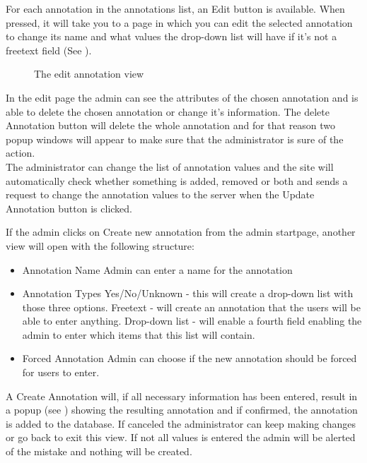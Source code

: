 For each annotation in the annotations list, an Edit button is available. 
When pressed, it will take you to a page in which you can edit the selected annotation to change its name and what values the drop-down list will have if it's not a freetext field (See ). 

\begin{figure}[h]
 \caption{The edit annotation view}
 \label{adm_web_editView}
\end{figure}
In the edit page the admin can see the attributes of the chosen annotation and is able to delete the chosen annotation or change it's information.
The delete Annotation button will delete the whole annotation and for that reason two popup windows will appear to make sure that the administrator is sure of the action.\\
The administrator can change the list of annotation values and the site will automatically check whether 
something is added, removed or both and sends a request to change the annotation values to the server when the Update Annotation button is clicked.

If the admin clicks on Create new annotation from the admin startpage, another view will open with the following structure:
\begin{itemize}
 \item Annotation Name
 \subitem Admin can enter a name for the annotation
 
 \item Annotation Types
 \subitem Yes/No/Unknown - this will create a drop-down list with those three options.
 \subitem Freetext - will create an annotation that the users will be able to enter anything.
 \subitem Drop-down list - will enable a fourth field enabling the admin to enter which items that this list will contain.
 
 \item Forced Annotation
 \subitem Admin can choose if the new annotation should be forced for users to enter. 
\end{itemize}

A Create Annotation will, if all necessary information has been entered, result in a popup (see ) showing the resulting annotation and if confirmed, the annotation is added to the database. 
If canceled the administrator can keep making changes or go back to exit this view. If not all values is entered the admin will be alerted of the mistake and nothing will be created.

